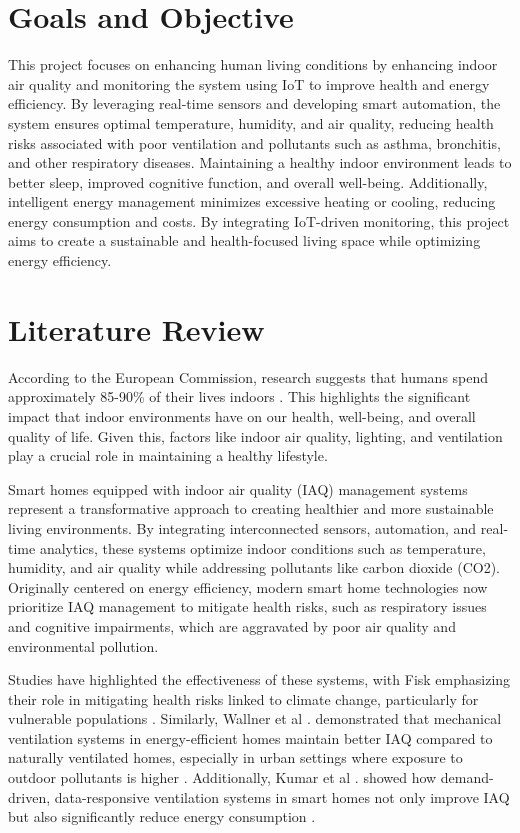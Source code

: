 \documentclass[a4paper]{scrartcl}
\begin{document}
\section{Goals and Objective}
This project focuses on enhancing human living conditions by enhancing indoor air quality and monitoring the system using IoT to improve health and energy efficiency. By leveraging real-time sensors and developing smart automation, the system ensures optimal temperature, humidity, and air quality, reducing health risks associated with poor ventilation and pollutants such as asthma, bronchitis, and other respiratory diseases. Maintaining a healthy indoor environment leads to better sleep, improved cognitive function, and overall well-being. Additionally, intelligent energy management minimizes excessive heating or cooling, reducing energy consumption and costs. By integrating IoT-driven monitoring, this project aims to create a sustainable and health-focused living space while optimizing energy efficiency.

\section{Literature Review}
According to the European Commission, research suggests that humans spend approximately 85-90\% of their lives indoors \cite{r19}. This highlights the significant impact that indoor environments have on our health, well-being, and overall quality of life. Given this, factors like indoor air quality, lighting, and ventilation play a crucial role in maintaining a healthy lifestyle.

\setlength{\footheight}{48pt}
\setlength{\headheight}{29pt}

Smart homes equipped with indoor air quality (IAQ) management systems represent a transformative approach to creating healthier and more sustainable living environments. By integrating interconnected sensors, automation, and real-time analytics, these systems optimize indoor conditions such as temperature, humidity, and air quality while addressing pollutants like carbon dioxide (CO2). Originally centered on energy efficiency, modern smart home technologies now prioritize IAQ management to mitigate health risks, such as respiratory issues and cognitive impairments, which are aggravated by poor air quality and environmental pollution.

Studies have highlighted the effectiveness of these systems, with Fisk emphasizing their role in mitigating health risks linked to climate change, particularly for vulnerable populations \cite{r14}. Similarly, Wallner et al \cite{r3}. demonstrated that mechanical ventilation systems in energy-efficient homes maintain better IAQ compared to naturally ventilated homes, especially in urban settings where exposure to outdoor pollutants is higher . Additionally, Kumar et al . showed how demand-driven, data-responsive ventilation systems in smart homes not only improve IAQ but also significantly reduce energy consumption \cite{r2}. 
\end{document}
